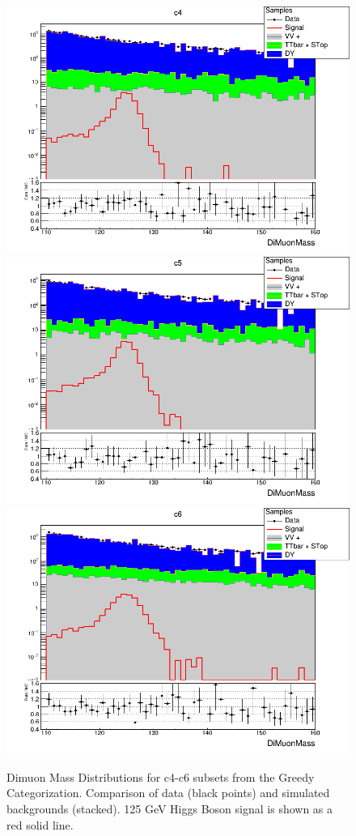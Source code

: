 \begin{figure}[htbp]
  \centering
  \includegraphics[width=0.65\linewidth]{figures/ch_higgs/distributions/bdt_uf/distribution__c4__DiMuonMass__logY.png}\\
  \includegraphics[width=0.65\linewidth]{figures/ch_higgs/distributions/bdt_uf/distribution__c5__DiMuonMass__logY.png}\\
  \includegraphics[width=0.65\linewidth]{figures/ch_higgs/distributions/bdt_uf/distribution__c6__DiMuonMass__logY.png}
  \caption{Dimuon Mass Distributions for c4-c6 subsets from the Greedy Categorization. Comparison of data (black points) and simulated backgrounds (stacked). 125 GeV Higgs Boson signal is shown as a red solid line.}
  \label{fig:higgs_categorization_greedyc4c6}
\end{figure}
